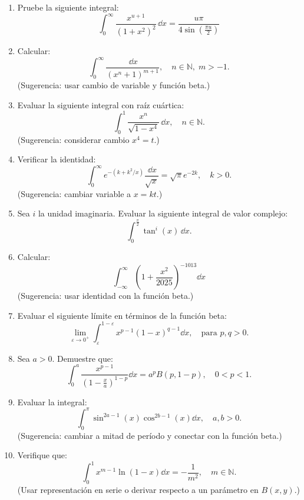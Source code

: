 \begin{enumerate}

	\item Pruebe la siguiente integral:
	      \[
		      \int_0^\infty \frac{x^{u+1}}{(1+x^2)^2} \, \dd{x}= \frac{u\pi}{4\sin\left(\frac{\pi u}{2}\right)}
	      \]

	\item Calcular:
	      \[
		      \int_0^\infty \frac{\, \dd{x}}{(x^n + 1)^{m+1}}, \quad n \in \mathbb{N},\; m > -1.
	      \]
	      (Sugerencia: usar cambio de variable y función beta.)

	\item Evaluar la siguiente integral con raíz cuártica:
	      \[
		      \int_0^1 \frac{x^n}{\sqrt{1 - x^4}} \, \dd{x}, \quad n \in \mathbb{N}.
	      \]
	      (Sugerencia: considerar cambio \( x^4 = t \).)

	\item Verificar la identidad:
	      \[
		      \int_0^\infty e^{-(k + k^2/x)} \frac{\, \dd{x}}{\sqrt{x}} = \sqrt{\pi} e^{-2k}, \quad k > 0.
	      \]
	      (Sugerencia: cambiar variable a \( x = k t \).)

	\item Sea \( i \) la unidad imaginaria. Evaluar la siguiente integral de valor complejo:
	      \[
		      \int_0^{\frac{\pi}{2}} \tan^i(x) \, \dd{x}.
	      \]

	\item Calcular:
	      \[
		      \int_{-\infty}^{\infty} \left(1+\frac{x^2}{2025}\right)^{-1013} \dd{x}
	      \]
	      (Sugerencia: usar identidad con la función beta.)

	\item Evaluar el siguiente límite en términos de la función beta:
	      \[
		      \lim_{\varepsilon \to 0^+} \int_\varepsilon^{1-\varepsilon} x^{p-1}(1-x)^{q-1} \dd{x}, \quad \text{para } p, q > 0.
	      \]



	\item Sea \( a > 0 \). Demuestre que:
	      \[
		      \int_0^a \frac{x^{p-1}}{(1 - \frac{x}{a})^{1-p}} \dd{x} = a^p B(p, 1 - p), \quad 0 < p < 1.
	      \]

	\item Evaluar la integral:
	      \[
		      \int_0^\pi \sin^{2a - 1}(x) \cos^{2b - 1}(x) \dd{x}, \quad a, b > 0.
	      \]
	      (Sugerencia: cambiar a mitad de período y conectar con la función beta.)

	\item Verifique que:
	      \[
		      \int_0^1 x^{m-1} \ln(1 - x) \dd{x} = -\frac{1}{m^2}, \quad m \in \mathbb{N}.
	      \]
	      (Usar representación en serie o derivar respecto a un parámetro en \( B(x,y) \).)


\end{enumerate}
